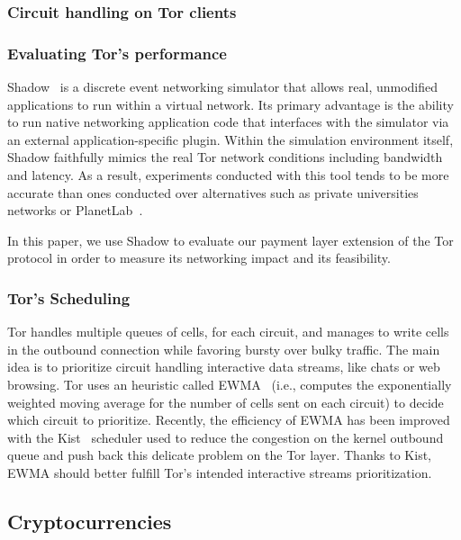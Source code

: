 \subsubsection{Circuit handling on Tor clients}


\subsubsection{Evaluating Tor's performance}
Shadow~\cite{jansen2011shadow} is a discrete event networking simulator that allows
real, unmodified applications to run within a virtual network. Its primary
advantage is the ability to run native networking application code that
interfaces with the simulator via an external application-specific
plugin. Within the simulation environment itself, Shadow faithfully mimics the
real Tor network conditions including bandwidth and latency. As a result,
experiments conducted with this tool tends to be more accurate than ones
conducted over alternatives such as private universities networks or
PlanetLab~\cite{Chun:2003:POT:956993.956995}.

In this paper, we use Shadow to evaluate our payment layer extension of the Tor
protocol in order to measure its networking impact and its feasibility.

\subsubsection{Tor's Scheduling}

Tor handles multiple queues of cells, for each circuit, and manages to write cells in the outbound connection while favoring bursty over bulky traffic. The main idea is to prioritize circuit handling interactive data streams, like chats or web browsing. Tor uses an heuristic called EWMA~\cite{ccs10-scheduling} (i.e., computes the exponentially weighted moving average for the number of cells sent on each circuit) to decide which circuit to prioritize. Recently, the efficiency of EWMA has been improved with the Kist~\cite{jansen14-kist} scheduler used to reduce the congestion on the kernel outbound queue and push back this delicate problem on the Tor layer. Thanks to Kist, EWMA should better fulfill Tor's intended interactive streams prioritization.

\subsection{Cryptocurrencies}

